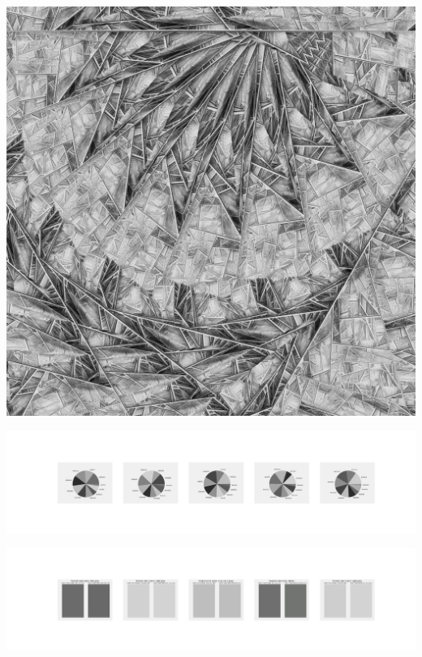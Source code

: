 \documentclass[11pt]{article}
\begin{document}
\begin{landscape}
    \begin{center}
    \includegraphics[width=\textwidth]{./nbimg/file (282).jpg}
    \end{center}

    \begin{center}
    \includegraphics[width=250mm]{./nbimg/pie-203.jpg}
    \end{center}

    \begin{center}
    \includegraphics[width=250mm]{./nbimg/peak-203.jpg}
    \end{center}
    


\end{landscape}
\end{document}
